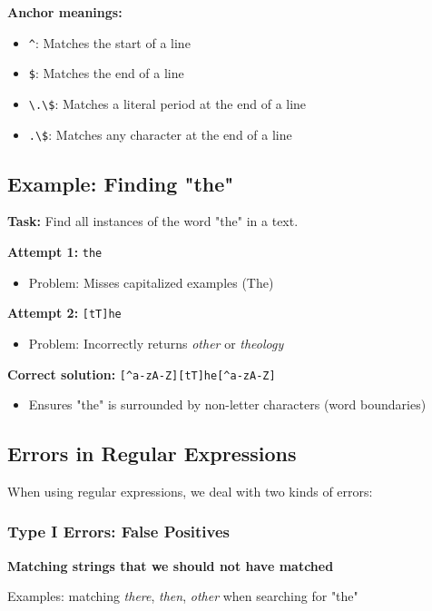 \documentclass[11pt,a4paper]{article}
\theoremstyle{definition}
\theoremstyle{plain}
\theoremstyle{remark}
\begin{document}
\textbf{Anchor meanings:}
\begin{itemize}
    \item \texttt{\^{}}: Matches the start of a line
    \item \texttt{\$}: Matches the end of a line
    \item \verb|\.\$|: Matches a literal period at the end of a line
    \item \verb|.\$|: Matches any character at the end of a line
\end{itemize}

\subsection{Example: Finding "the"}

\textbf{Task:} Find all instances of the word "the" in a text.

\textbf{Attempt 1:} \texttt{the}
\begin{itemize}
    \item Problem: Misses capitalized examples (The)
\end{itemize}

\textbf{Attempt 2:} \texttt{[tT]he}
\begin{itemize}
    \item Problem: Incorrectly returns \textit{other} or \textit{theology}
\end{itemize}

\textbf{Correct solution:} \texttt{[\^{}a-zA-Z][tT]he[\^{}a-zA-Z]}
\begin{itemize}
    \item Ensures "the" is surrounded by non-letter characters (word boundaries)
\end{itemize}

\subsection{Errors in Regular Expressions}

When using regular expressions, we deal with two kinds of errors:

\subsubsection{Type I Errors: False Positives}

\textbf{Matching strings that we should not have matched}

Examples: matching \textit{there}, \textit{then}, \textit{other} when searching for "the"
\end{document}
